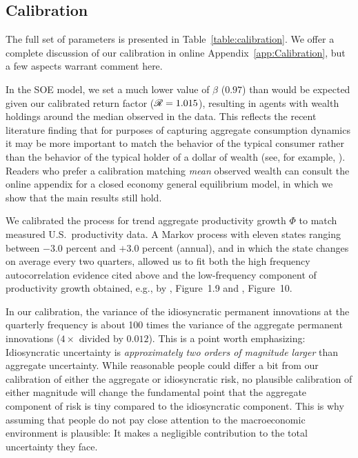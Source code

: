 \documentclass[titlepage]{./econtex}
\begin{document}
\subsection{Calibration}\label{sec:calibration}

The full set of parameters is presented in Table~\ref{table:calibration}.  We offer a complete discussion of our calibration in online Appendix~\ref{app:Calibration}, but a few aspects warrant comment here.

In the SOE model, we set a much lower value of $\beta$ ($ %
0.97 %
 $) than would be expected given our calibrated return factor (${\mathscr{R}} = 1.015$), resulting in agents with wealth holdings around the median observed in the data.  This reflects the recent literature finding that for purposes of capturing aggregate consumption dynamics it may be more important to match the behavior of the typical consumer rather than the behavior of the typical holder of a dollar of wealth (see, for example, \cite{opLiquidH2M}).  Readers who prefer a calibration matching \textit{mean} observed wealth can consult the online appendix for a closed economy general equilibrium model, in which we show that the main results still hold.

We calibrated the process for trend aggregate productivity growth $\Phi$ to match measured U.S.\ productivity data.  A Markov process with eleven states ranging between $-3.0$ percent and $+3.0$ percent (annual), and in which the state changes on average every two quarters, allowed us to fit both the high frequency autocorrelation evidence cited above and the low-frequency component of productivity growth obtained, e.g., by \cite{sswNAIRU}, Figure~1.9 and \cite{fernald:disappointingRecovery}, Figure~10.

In our calibration, the variance of the idiosyncratic permanent innovations at the quarterly frequency is about 100 times the variance of the aggregate permanent innovations ($4 \times $ divided by $%
0.012 %
 $).  This is a point worth emphasizing: Idiosyncratic uncertainty is {\it approximately two orders of magnitude larger} than aggregate uncertainty.  While reasonable people could differ a bit from our calibration of either the aggregate or idiosyncratic risk, no plausible calibration of either magnitude will change the fundamental point that the aggregate component of risk is tiny compared to the idiosyncratic component.  This is why assuming that people do not pay close attention to the macroeconomic environment is plausible: It makes a negligible contribution to the total uncertainty they face.
\end{document}
